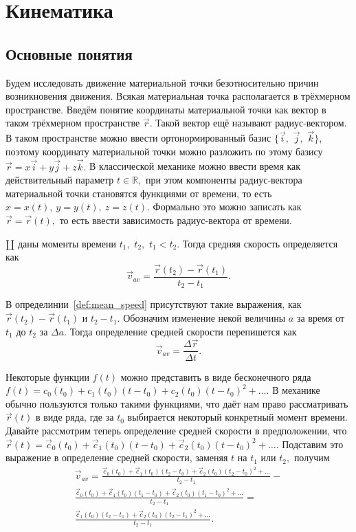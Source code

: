 \chapter{Кинематика}
\section{Основные понятия}
Будем исследовать движение материальной точки безотносительно
причин возникновения движения. Всякая материальная точка располагается в
трёхмерном пространстве. Введём понятие координаты материальной точки
как вектор в таком трёхмерном пространстве $\vec{r}$. Такой вектор ещё называют
радиус-вектором. В таком пространстве можно ввести ортонормированный базис
$\{\vec{i},$ $\vec{j},$ $\vec{k}\}$,
поэтому координату материальной точки можно разложить по этому базису
$\vec{r} = x\vec{i}+y\vec{j}+z\vec{k}.$ В классической механике 
можно ввести время как действительный параметр $t\in\mathbb{R},$
при этом компоненты радиус-вектора материальной точки становятся
функциями от времени, то есть $x = x(t),~y=y(t),~z=z(t).$
Формально это можно записать как $\vec{r} = \vec{r} (t),$ то есть
ввести зависимость радиус-вектора от времени.
\begin{definition}
$\amalg$ даны моменты времени $t_1,$ $t_2,$ $t_1 < t_2.$
Тогда средняя скорость определяется как
$$\vec{v}_{av} = \frac{\vec{r}(t_2)-\vec{r}(t_1)}{t_2-t_1}.$$
\label{def:mean_speed}
\end{definition}
В определинии~\ref{def:mean_speed} присутствуют такие выражения, как
$\vec{r}(t_2)-\vec{r}(t_1)$ и $t_2 - t_1.$ Обозначим изменение некой
величины $a$ за время от $t_1$ до $t_2$ за $\Delta a.$ Тогда определение
средней скорости перепишется как $$\vec{v}_{av} = \frac {\Delta \vec{r}}{\Delta t}.$$
\par
Некоторые функции $f(t)$ можно представить в виде бесконечного ряда
$f(t) = c_0(t_0)+c_1(t_0) (t-t_0) + c_2(t_0) (t-t_0)^2 + \ldots.$ В механике обычно
пользуются только такими функциями, что даёт нам право рассматривать $\vec{r}(t)$
в виде ряда, где за $t_0$ выбирается некоторый конкретный момент времени.
Давайте рассмотрим теперь определение средней скорости в предположении,
что
$\vec{r}(t) = \vec{c}_0(t_0) +\vec{c}_1(t_0) (t-t_0) + \vec{c}_2(t_0) (t-t_0)^2+\ldots.$
Подставим это выражение в определение средней скорости, заменяя $t$ на $t_1$ или $t_2,$
получим
\begin{multline*}
\vec{v}_{av} =
 \frac{\vec{c}_0(t_0) +\vec{c}_1(t_0) (t_2-t_0) + \vec{c}_2(t_0) (t_2-t_0)^2+\ldots}{t_2-t_1}-\\
 \frac{\vec{c}_0(t_0) +\vec{c}_1(t_0) (t_1-t_0) + \vec{c}_2(t_0) (t_1-t_0)^2+\ldots}{t_2-t_1}=\\
 \frac{\vec{c}_1(t_0) (t_2-t_1) + \vec{c}_2(t_0) (t_2-t_1)^2+\ldots}{t_2-t_1}.
\end{multline*}
